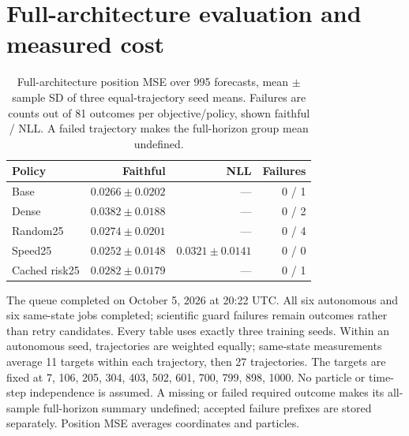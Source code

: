\section{Full-architecture evaluation and measured cost}

\label{sec:full-results}

\begin{table}[t]
\centering\small
\caption{Full-architecture position MSE over 995 forecasts, mean $\pm$ sample SD of three equal-trajectory seed means. Failures are counts out of 81 outcomes per objective/policy, shown faithful / NLL. A failed trajectory makes the full-horizon group mean undefined.}
\label{tab:full-rollouts}
\begin{tabular}{lrrr}
\toprule
Policy & Faithful & NLL & Failures\\
\midrule
Base & $0.0266\pm0.0202$ & --- & 0 / 1\\
Dense & $0.0382\pm0.0188$ & --- & 0 / 2\\
Random25 & $0.0274\pm0.0201$ & --- & 0 / 4\\
Speed25 & $0.0252\pm0.0148$ & $0.0321\pm0.0141$ & 0 / 0\\
Cached risk25 & $0.0282\pm0.0179$ & --- & 0 / 1\\
\bottomrule
\end{tabular}
\end{table}

The queue completed on October 5, 2026 at 20:22 UTC. All six autonomous and six
same-state jobs completed; scientific guard failures remain outcomes rather
than retry candidates. Every table uses exactly three training seeds. Within
an autonomous seed, trajectories are weighted equally; same-state measurements
average 11 targets within each trajectory, then 27 trajectories. The targets
are fixed at 7, 106, 205, 304, 403, 502, 601, 700, 799, 898, 1000. No particle or time-step independence is assumed. A missing or failed required outcome
makes its all-sample full-horizon summary undefined; accepted failure prefixes
are stored separately. Position MSE averages coordinates and particles.


